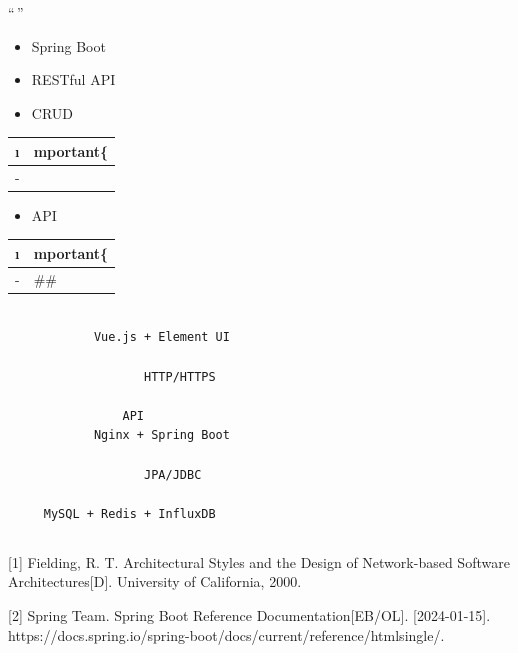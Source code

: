 ``\,''

\important{}

\begin{itemize}
\tightlist
\item
  Spring Boot
\item
  RESTful API
\item
  CRUD
\end{itemize}

\begin{longtable}[]{@{}ll@{}}
\toprule\noalign{}
\i & mportant\{} \\
\midrule\noalign{}
\endhead
\bottomrule\noalign{}
\endlastfoot
- & \important{} \\
\end{longtable}

\begin{itemize}
\tightlist
\item
  API
\end{itemize}

\begin{longtable}[]{@{}ll@{}}
\toprule\noalign{}
\i & mportant\{} \\
\midrule\noalign{}
\endhead
\bottomrule\noalign{}
\endlastfoot
- & \#\# \\
\end{longtable}

\begin{lstlisting}

            Vue.js + Element UI                

                   HTTP/HTTPS

                API                        
            Nginx + Spring Boot                

                   JPA/JDBC

     MySQL + Redis + InfluxDB       

\end{lstlisting}

\hypertarget{section-7}{%
\subsection{}\label{section-7}}

{[}1{]} Fielding, R. T. Architectural Styles and the Design of
Network-based Software Architectures{[}D{]}. University of California,
2000.

{[}2{]} Spring Team. Spring Boot Reference Documentation{[}EB/OL{]}.
{[}2024-01-15{]}.
https://docs.spring.io/spring-boot/docs/current/reference/htmlsingle/.

